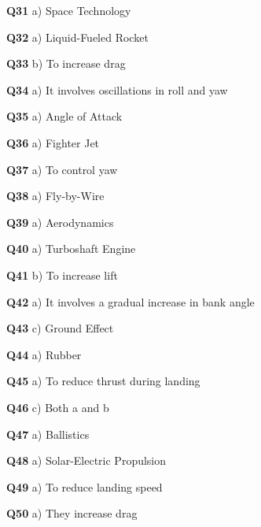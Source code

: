\textbf{Q31} a) Space Technology\par
\textbf{Q32} a) Liquid-Fueled Rocket\par
\textbf{Q33} b) To increase drag\par
\textbf{Q34} a) It involves oscillations in roll and yaw\par
\textbf{Q35} a) Angle of Attack\par
\textbf{Q36} a) Fighter Jet\par
\textbf{Q37} a) To control yaw\par
\textbf{Q38} a) Fly-by-Wire\par
\textbf{Q39} a) Aerodynamics\par
\textbf{Q40} a) Turboshaft Engine\par
\textbf{Q41} b) To increase lift\par
\textbf{Q42} a) It involves a gradual increase in bank angle\par
\textbf{Q43} c) Ground Effect\par
\textbf{Q44} a) Rubber\par
\textbf{Q45} a) To reduce thrust during landing\par
\textbf{Q46} c) Both a and b\par
\textbf{Q47} a) Ballistics\par
\textbf{Q48} a) Solar-Electric Propulsion\par
\textbf{Q49} a) To reduce landing speed\par
\textbf{Q50} a) They increase drag\par